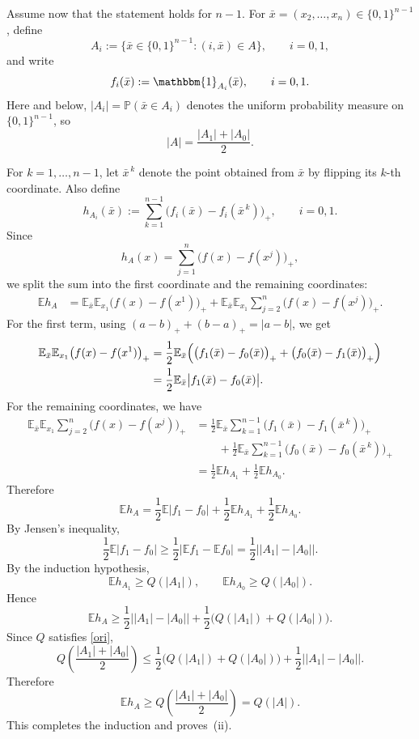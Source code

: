 \documentclass[11pt]{amsart}
\theoremstyle{definition}
\newcommand{\E}{\mathbb{E}}
\renewcommand{\1}{{\mathbbm{1}}}
\begin{document}
Assume now that the statement holds for $n-1$. For $\bar x=(x_2,\dots,x_n)\in\{0,1\}^{n-1}$, define
\[
A_i:=\{\bar x\in\{0,1\}^{n-1}:(i,\bar x)\in A\},\qquad i=0,1,
\]
and write
\[
f_i(\bar x):=\mathbbm{1}_{A_i}(\bar x),\qquad i=0,1.
\]
Here and below, $|A_i|=\mathbb P(\bar x\in A_i)$ denotes the uniform probability measure on $\{0,1\}^{n-1}$, so
\[
|A|=\frac{|A_1|+|A_0|}{2}.
\]

For $k=1,\dots,n-1$, let $\bar x^{\,k}$ denote the point obtained from $\bar x$ by flipping its $k$-th coordinate. Also define
\[
h_{A_i}(\bar x):=\sum_{k=1}^{n-1}\bigl(f_i(\bar x)-f_i(\bar x^{\,k})\bigr)_+,
\qquad i=0,1.
\]
Since
\[
h_A(x)=\sum_{j=1}^n \bigl(f(x)-f(x^j)\bigr)_+,
\]
we split the sum into the first coordinate and the remaining coordinates:
\begin{align*}
\E h_A
&=
\E_{\bar x}\E_{x_1}\bigl(f(x)-f(x^1)\bigr)_+
+
\E_{\bar x}\E_{x_1}\sum_{j=2}^n \bigl(f(x)-f(x^j)\bigr)_+.
\end{align*}
For the first term, using $(a-b)_+ + (b-a)_+ = |a-b|$, we get
\begin{align*}
\E_{\bar x}\E_{x_1}\bigl(f(x)-f(x^1)\bigr)_+
&=
\frac12 \E_{\bar x}\Bigl(\bigl(f_1(\bar x)-f_0(\bar x)\bigr)_+ + \bigl(f_0(\bar x)-f_1(\bar x)\bigr)_+\Bigr) \\
&=
\frac12 \E_{\bar x}\bigl|f_1(\bar x)-f_0(\bar x)\bigr|.
\end{align*}
For the remaining coordinates, we have
\begin{align*}
\E_{\bar x}\E_{x_1}\sum_{j=2}^n \bigl(f(x)-f(x^j)\bigr)_+
&=
\frac12 \E_{\bar x}\sum_{k=1}^{n-1}\bigl(f_1(\bar x)-f_1(\bar x^{\,k})\bigr)_+ \\
&\qquad+
\frac12 \E_{\bar x}\sum_{k=1}^{n-1}\bigl(f_0(\bar x)-f_0(\bar x^{\,k})\bigr)_+ \\
&=
\frac12 \E h_{A_1}+\frac12 \E h_{A_0}.
\end{align*}
Therefore
\[
\E h_A
=
\frac12 \E\bigl|f_1-f_0\bigr|
+\frac12 \E h_{A_1}
+\frac12 \E h_{A_0}.
\]
By Jensen's inequality,
\[
\frac12 \E\bigl|f_1-f_0\bigr|
\ge
\frac12 \bigl|\E f_1-\E f_0\bigr|
=
\frac12 \bigl||A_1|-|A_0|\bigr|.
\]
By the induction hypothesis,
\[
\E h_{A_1}\ge Q(|A_1|),\qquad \E h_{A_0}\ge Q(|A_0|).
\]
Hence
\[
\E h_A
\ge
\frac12 \bigl||A_1|-|A_0|\bigr|
+\frac12\bigl(Q(|A_1|)+Q(|A_0|)\bigr).
\]
Since $Q$ satisfies \eqref{ori},
\[
Q\!\left(\frac{|A_1|+|A_0|}{2}\right)
\le
\frac12\bigl(Q(|A_1|)+Q(|A_0|)\bigr)
+
\frac12\bigl||A_1|-|A_0|\bigr|.
\]
Therefore
\[
\E h_A\ge Q\!\left(\frac{|A_1|+|A_0|}{2}\right)=Q(|A|).
\]
This completes the induction and proves~(ii).\\
\end{document}
